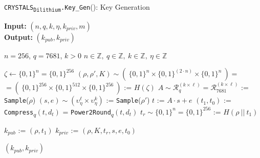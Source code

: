 \documentclass[runningheads]{llncs}
\numberwithin{equation}{section}
\begin{document}
    \begin{algorithm}
        \caption{\texorpdfstring{\texttt{CRYSTALS}\textsubscript{\texttt{Dilithium}}\texttt{.Key\_Gen}()}\/: Key Generation}
        \label{subrou:crystals-dilithium-key-gen}
        
        \textbf{Input:} $\left( n, q, k, \eta, {k}_{priv}, m \right)$\\
        \textbf{Output:} $ ( {k}_{pub}, {k}_{priv} ) $
    
        \begin{algorithmic}[1]
            \Require $n = 256$, $q = 7681$, $k > 0$
            \Ensure $n \in \mathbb{Z},\ q \in \mathbb{Z},\ k \in \mathbb{Z},\ \eta \in \mathbb{Z}$
            
            \vspace{2ex}
            
            \State $\zeta \gets { \{ 0 , 1 \} }^{n} = { \{ 0 , 1 \} }^{256}$
            \State $(\rho, \rho', K) \sim \left(\ { \{ 0 , 1 \} }^{n} \times { \{ 0 , 1 \} }^{ (2 \cdot n) } \times { \{ 0 , 1 \} }^{n}\ \right) = $
            \Statex \hspace{15ex} $ = \left(\ { \{ 0 , 1 \} }^{256} \times { \{ 0 , 1 \} }^{512} \times { \{ 0 , 1 \} }^{256}\ \right)$ := $H( \zeta )$
            \State $A \sim {\mathcal{R}}_{q}^{( k \times \ell )} = {\mathcal{R}}_{7681}^{( k \times \ell )}$ := \texttt{Sample}($\rho$)
            \State $(s, e) \sim \left( {\upsilon}_{\eta}^{\ell} \times {\upsilon}_{\eta}^{k} \right)$ := \texttt{Sample}($\rho'$)
            \State $t$ := $A \cdot s + e$
            \State $({t}_{1}, {t}_{0})$ := \texttt{Compress}\textsubscript{$q$}$\left( t, {d}_{t} \right)$ = \texttt{Power2Round}\textsubscript{$q$}$\left( t, {d}_{t} \right)$
            \State ${t}_{r} \sim { \{ 0 , 1 \} }^{n} = { \{ 0 , 1 \} }^{256}$ := $H\left( \rho\ ||\ {t}_{1} \right)$
            
            \vspace{1ex}
            
            \State ${k}_{pub}$ := $\left( \rho, {t}_{1} \right)$
            \State ${k}_{priv}$ := $\left( \rho, K, {t}_{r}, s, e, {t}_{0} \right)$
            
            \vspace{1ex}
            
            \State \Return $( {k}_{pub}, {k}_{priv} )$
        \end{algorithmic}
   
    \end{algorithm}
\end{document}
